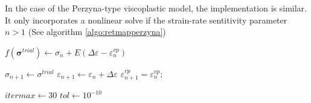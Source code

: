 \documentclass[final,5p,times,twocolumn]{elsarticle}
\begin{document}
In the case of the Perzyna-type viscoplastic model, the implementation is similar. It only incorporates a nonlinear solve if the strain-rate sentitivity parameter $n > 1$ (See algorithm \ref{algo:retmapperzyna})

\begin{algorithm}
  $f(\boldsymbol{\sigma}^{trial}) \gets \sigma_n + E(\Delta\varepsilon - \varepsilon^{vp}_n)$\;
  {
    $\sigma_{n+1} \gets \sigma^{trial}$\;
    $\varepsilon_{n+1} \gets \varepsilon_n + \Delta\varepsilon$\;
    $\varepsilon_{n+1}^{vp}=\varepsilon^{vp}_n$;

  }
  
  \;
  \caption{{\sc PerzynaReturnMapping} Solve the stress state for next stress increment using return mapping for the Perzyna-type viscoplastic model}
  \label{algo:retmapperzyna}
\end{algorithm}

\begin{algorithm}
  \KwOut{$\Delta \gamma$}


    $itermax \gets 30$\;
    $tol \gets 10^{-10}$\;

    

  
  \Return{$\Delta \gamma$}\;
  \caption{{$NonLinear\Delta\gamma$} Solve the plastic multiplier increment for the Perzyna-type viscoplastic model for the $n>1$ non-linear case}
  \label{algo:lindgamma}
\end{algorithm}



\end{document}
